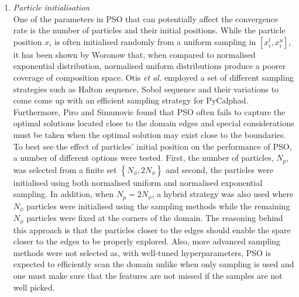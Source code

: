\begin{enumerate}
		\item \emph{Particle initialisation}\\
			One of the parameters in PSO that can potentially affect the convergence rate is the number of particles and their initial positions. While the particle position $x_i$ is often initialised randomly from a uniform sampling in $\left[ x_i^l, x_i^u\right]$, it has been shown by Woronow \cite{Woronow:1993aa} that, when compared to normalised exponential distribution, normalised uniform distributions produce a poorer coverage of composition space. Otis \textit{et al.} \cite{Otis:2017ab} employed a set of different sampling strategies such as Halton sequence, Sobol sequence and their variations to come come up with an efficient sampling strategy for PyCalphad. Furthermore, Piro and Simunovic \cite{Piro16} found that PSO often fails to capture the optimal solutions located close to the domain edges and special considerations must be taken when the optimal solution may exist close to the boundaries. To best see the effect of particles' initial position on the performance of PSO, a number of different options were tested. First, the number of particles, $N_p$, was selected from a finite set $\left\{ N_\phi, 2N_\phi\right\}$ and second, the particles were initialised using both normalised uniform and normalised exponential sampling. In addition, when $N_p = 2N_\phi$, a hybrid strategy was also used where $N_\phi$ particles were initialised using the sampling methods while the remaining $N_\phi$ particles were fixed at the corners of the domain. The reasoning behind this approach is that the particles closer to the edges should enable the spare closer to the edges to be properly explored. Also, more advanced sampling methods were not selected as, with well-tuned hyperparameters, PSO is expected to efficiently scan the domain unlike when only sampling is used and one must make sure that the features are not missed if the samples are not well picked. 


\end{enumerate}
